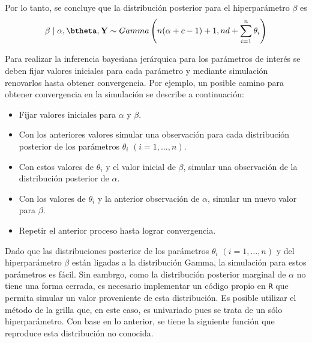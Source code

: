 Por lo tanto, se concluye que la distribución posterior para el hiperparámetro $\beta$ es
\begin{equation*}
\beta\mid \alpha,\btheta,\mathbf{Y}
\sim Gamma\left(n(\alpha+c-1)+1, nd+\sum_{i=1}^n\theta_i\right)
\end{equation*}

Para realizar la inferencia bayesiana jerárquica para los parámetros de interés se deben fijar valores iniciales para cada parámetro y mediante simulación renovarlos hasta obtener convergencia. Por ejemplo, un posible camino para obtener convergencia en la simulación se describe a continuación:

\begin{itemize}
  \item Fijar valores iniciales para $\alpha$ y $\beta$.
  \item Con los anteriores valores simular una observación para cada distribución posterior de los parámetros $\theta_i$ $(i=1,\ldots,n)$.
  \item Con estos valores de $\theta_i$ y el valor inicial de $\beta$, simular una observación de la distribución posterior de $\alpha$.
  \item Con los valores de $\theta_i$ y la anterior observación de $\alpha$, simular un nuevo valor para $\beta$.
  \item Repetir el anterior proceso hasta lograr convergencia.
\end{itemize}

Dado que las distribuciones posterior de los parámetros $\theta_i$ $(i=1,\ldots,n)$ y del hiperparámetro $\beta$ están ligadas a la distribución Gamma, la simulación para estos parámetros es fácil. Sin eambrgo, como la distribución posterior marginal de $\alpha$ no tiene una forma cerrada, es necesario implementar un código propio en \verb'R' que permita simular un valor proveniente de esta distribución. Es posible utilizar el método de la grilla que, en este caso, es univariado pues se trata de un sólo hiperparámetro. Con base en lo anterior, se tiene la siguiente función que reproduce esta distribución no conocida.

\begin{knitrout}
\color{fgcolor}\begin{kframe}
\begin{alltt}
  \hlkwb{<-} \hlstd{(}\hlstd{,} \hlstd{,} \hlstd{,} \hlstd{,} \hlstd{)\{}
    \hlkwb{<-} \hlopt{^} \hlopt{*} \hlopt{^}\hlopt{-}\hlstd{))} \hlopt{/} 
    \hlkwb{<-} \hlopt{^}\hlopt{-}\hlstd{)}
    \hlkwb{<-}  \hlstd{(}\hlopt{-}\hlopt{*}
    \hlkwb{<-} \hlopt{*}\hlopt{*}
 \hlstd{\}}
\end{alltt}
\end{kframe}
\end{knitrout}

